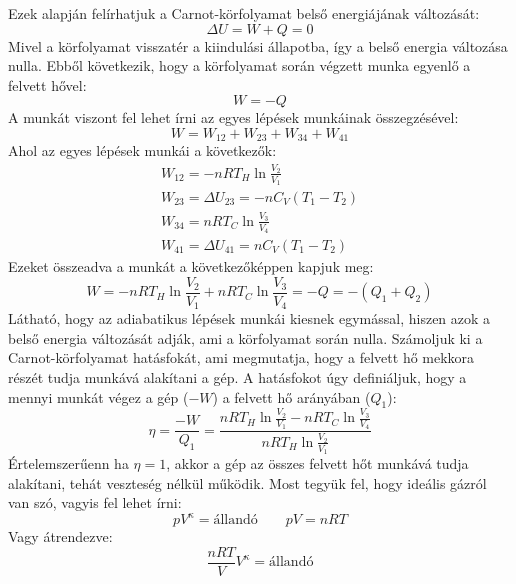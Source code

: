 \documentclass[../main.tex]{subfiles}
\begin{document}
Ezek alapján felírhatjuk a Carnot-körfolyamat belső energiájának változását:
\begin{equation}
    \Delta U = W + Q = 0
\end{equation}
Mivel a körfolyamat visszatér a kiindulási állapotba, így a belső energia változása nulla. Ebből következik, hogy a körfolyamat során végzett munka egyenlő a felvett hővel:
\begin{equation}
    W = - Q
\end{equation}
A munkát viszont fel lehet írni az egyes lépések munkáinak összegzésével:
\begin{equation}
    W = W_{12} + W_{23} + W_{34} + W_{41}
\end{equation}
Ahol az egyes lépések munkái a következők:
\begin{equation}
    \begin{aligned}
        W_{12} = - n R T_H \ln{\frac{V_2}{V_1}} \\
        W_{23} = \Delta U_{23} = - n C_V (T_1 - T_2) \\
        W_{34} = n R T_C \ln{\frac{V_3}{V_4}} \\
        W_{41} = \Delta U_{41} = n C_V (T_1 - T_2)
    \end{aligned}
\end{equation}
Ezeket összeadva a munkát a következőképpen kapjuk meg:
\begin{equation}
    W = - n R T_H \ln{\frac{V_2}{V_1}} + n R T_C \ln{\frac{V_3}{V_4}} = - Q = - (Q_1 + Q_2)
\end{equation}
Látható, hogy az adiabatikus lépések munkái kiesnek egymással, hiszen azok a belső energia változását adják, ami a körfolyamat során nulla.
Számoljuk ki a Carnot-körfolyamat hatásfokát, ami megmutatja, hogy a felvett hő mekkora részét tudja munkává alakítani a gép. A hatásfokot úgy definiáljuk, hogy a mennyi munkát végez a gép ($-W$) a felvett hő arányában ($Q_1$):
\begin{equation}
    \eta = \frac{- W}{Q_1} = \frac{n R T_H \ln{\frac{V_2}{V_1}} - n R T_C \ln{\frac{V_3}{V_4}}}{n R T_H \ln{\frac{V_2}{V_1}}}
\end{equation}
Értelemszerűenn ha $\eta = 1$, akkor a gép az összes felvett hőt munkává tudja alakítani, tehát veszteség nélkül működik.
Most tegyük fel, hogy ideális gázról van szó, vagyis fel lehet írni:
\begin{equation}
    p V^{\kappa} = \text{állandó} \qquad pV = n R T
\end{equation}
Vagy átrendezve:
\begin{equation}
    \frac{nRT}{V} V^{\kappa} = \text{állandó}
\end{equation}
\end{document}
